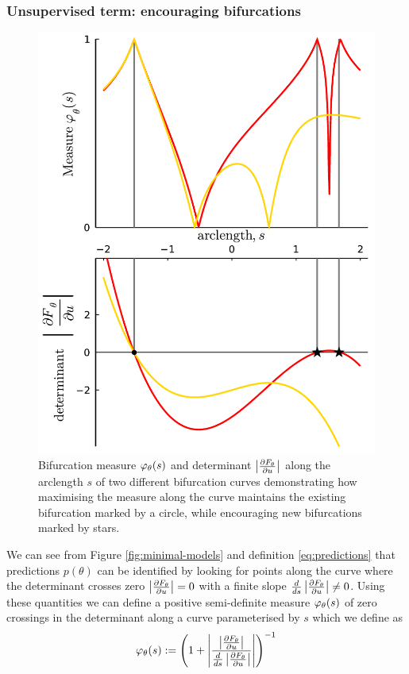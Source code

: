 \documentclass{article}
\begin{document}
\subsubsection{Unsupervised term: encouraging bifurcations}
\begin{figure}
    \centering
    \includegraphics[width=\linewidth]{bifurcation-measure}
    \caption{Bifurcation measure $\varphi_{\theta}(s)$ and determinant $\left| \frac{\partial F_{\theta}}{\partial u} \right|$ along the arclength $s$ of two different bifurcation curves demonstrating how maximising the measure along the curve maintains the existing bifurcation marked by a circle, while encouraging new bifurcations marked by stars.}
    \label{fig:measure}
\end{figure}

We can see from Figure \ref{fig:minimal-models} and definition \eqref{eq:predictions} that predictions $p(\theta)$ can be identified by looking for points along the curve where the determinant crosses zero $\left| \frac{\partial F_{\theta}}{\partial u} \right|=0$ with a finite slope $\frac{d}{ds}\left| \frac{\partial F_{\theta}}{\partial u} \right|\neq 0$. Using these quantities we can define a positive semi-definite measure $\varphi_{\theta}(s)$ of zero crossings in the determinant along a curve parameterised by $s$ which we define as 
\begin{equation}
    \varphi_{\theta}(s):=
    \left(1+\left|\frac{\left| \frac{\partial F_{\theta}}{\partial u} \right|}{\frac{d}{ds}\left| \frac{\partial F_{\theta}}{\partial u} \right|}\right|\right)^{-1}
    \label{eq:measure}
\end{equation}
\end{document}

